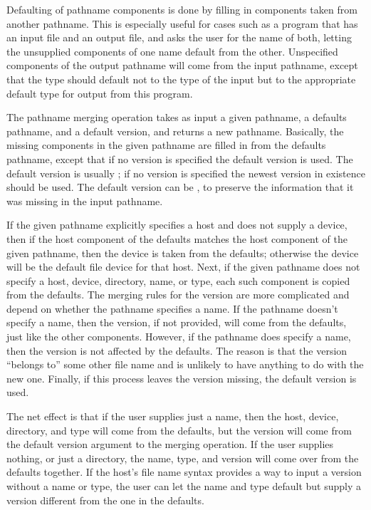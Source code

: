 \begin{defun}[Function]
Defaulting of pathname components is done by filling in components taken
from another pathname.
This is especially useful for
cases such as a program that has an input file and an output file, and
asks the user for the name of both, letting the unsupplied components of
one name default from the other.  Unspecified components of the output
pathname will come from the input pathname, except that the type should
default not to the type of the input but to the appropriate default type
for output from this program.

The pathname merging operation takes as input a given pathname, a
defaults pathname, and a default version, and returns a
new pathname.  Basically, the missing components in the given pathname
are filled in from the defaults pathname, except that
if no version is specified the
default version is used.
The default version is usually ; if no version is specified
the newest version in existence should be used.  The default
version can be {\nil}, to preserve the information that it was missing
in the input pathname.

If the
given pathname explicitly specifies a host and does not supply a device, then
if the host component of the defaults matches the host component
of the given pathname, then the device is taken from the defaults;
otherwise
the device will be the default file device for that host.  Next, if
the
given pathname does not specify a host, device, directory, name,
or type, each such
component is copied from the defaults.
The merging rules for the version are more complicated and
depend on whether the pathname specifies a name.  If the pathname
doesn't specify a name, then the version, if not provided, will
come from the defaults, just like the other components.  However, if the
pathname does specify a name, then the version is not affected
by the defaults.  The reason is that the version
``belongs to'' some other file name and is unlikely to have anything to do
with the new one.  Finally, if this process leaves the
version missing, the default version is used.

The net effect is that if the user supplies just a name, then the
host, device, directory, and type will come from the defaults, but the
version will come from the default version
argument to the merging operation.  If the user supplies nothing, or
just a directory, the name, type, and version will come over from
the defaults together.  If the host's file name syntax provides a way
to input a version without a name or type, the user can let the name
and type
default but supply a version different from the one in the defaults.


\end{defun}

